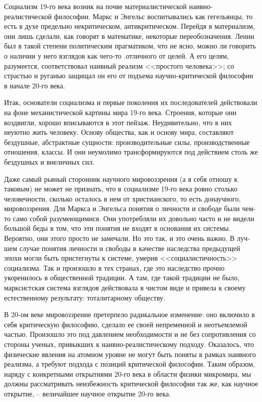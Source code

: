 \documentclass{book}
\begin{document}
Социализм 19-го века возник на почве материалистической наивно-реалистической философии. Маркс и Энгельс воспитывались как гегельянцы, то есть в духе предельно некритическом, антикритическом. Перейдя в материализм, они лишь сделали, как говорят в математике, некоторые переобозначения. Ленин был в такой степени политическим прагматиком, что не ясно, можно ли говорить о наличии у него взглядов как чего-то .отличного от целей. А его целям, разумеется, соответствовал наивный реализм <<простого человека>>; со страстью и руганью защищал он его от подъема научно-критической фило­софии в начале 20-го века.

Итак, основатели социализма и первые поколения их после­дователей действовали на фоне механистической картины мира 19-го века. Строения, которые они воздвигли, хорошо вписы­ваются в этот пейзаж. Неудивительно, что в них неуютно жить человеку. Основу общества, как и основу мира, составляют бездушные, абстрактные сущности: производительные силы, производственные отношения, классы. И они неумолимо транс­формируются под действием столь же бездушных и внеличных сил.

Даже самый рьяный сторонник научного мировоззрения (а я себя отношу к таковым) не может не признать, что в социа­лизме 19-го века ровно столько человечности, сколько оста­лось в нем от христианского, то есть донаучного, мировоззре­ния. Для Маркса и Энгельса понятия о личности и свободе были чем-то само собой разумеющимися. Они употребляли их довольно часто и не видели большой беды в том, что эти понятия не входят в основания  их системы. Вероятно, они этого просто не замечали. Но это так, и это очень важно. В луч­шем случае понятия личности и свободы в качестве наследства предыдущей эпохи могли быть пристегнуты к системе, умерив <<социалистичность>> социализма. Так и произошло в тех стра­нах, где это наследство прочно укоренилось в общественной традиции. А там, где такой традиции не было, марксистская си­стема взглядов действовала в чистом виде и привела к своему естественному результату: тоталитарному обществу.

В 20-ом веке мировоззрение претерпело радикальное изме­нение: оно включило в себя критическую философию, сдела­ло ее своей непременной и неотъемлемой частью. Произошло это под давлением необходимости и не без сопротивления со стороны ученых, привыкших к наивно-реалистическому подходу. Оказалось, что физические явления на атомном уровне не могут быть поняты в рамках наивного реализма, а требуют подхода с позиций критической философии. Таким образом, наряду с конкретными открытиями 20-го века в области физики микромира, мы должны рассматривать неизбежность критиче­ской философии  так же, как научное открытие, --  величайшее научное открытие 20-го века.
\end{document}
